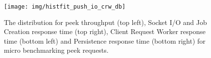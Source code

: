\documentclass{article}
\begin{document}
        \begin{figure}[hbtp]
        \centering
        \texttt{[image: img/histfit\_push\_io\_crw\_db]}
        \caption{The distribution for peek throughput (top left), Socket I/O and Job Creation response time (top right), Client Request Worker response time (bottom left) and Persistence response time (bottom right) for micro benchmarking peek requests.}
        \end{figure}
        
        
\end{document}
